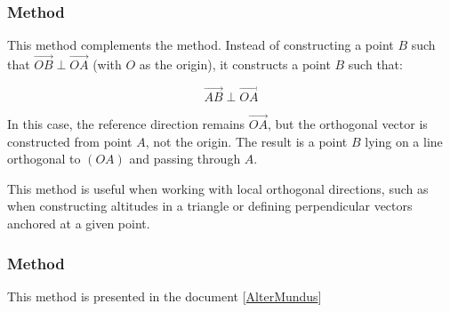\subsubsection{Method }
\label{ssub:_point_at_method}

This method complements the  method. Instead of constructing a point $B$ such that $\overrightarrow{OB} \perp \overrightarrow{OA}$ (with $O$ as the origin), it constructs a point $B$ such that:

\[
\overrightarrow{AB} \perp \overrightarrow{OA}
\]


In this case, the reference direction remains $\overrightarrow{OA}$, but the orthogonal vector is constructed from point $A$, not the origin. The result is a point $B$ lying on a line orthogonal to $(OA)$ and passing through $A$.

\medskip

This method is useful when working with local orthogonal directions, such as when constructing altitudes in a triangle or defining perpendicular vectors anchored at a given point.

\vspace{1em}

\begin{tkzexample}[latex=7cm]
 \begin{center}
 \end{center}
\end{tkzexample}

\subsubsection{Method }
\label{ssub:point_PPP}
This method is presented in the document  [\href{https://altermundus.fr}{AlterMundus}]

\begin{tkzexample}[latex=.4\textwidth]

\begin{center}
\end{center}
\end{tkzexample}



